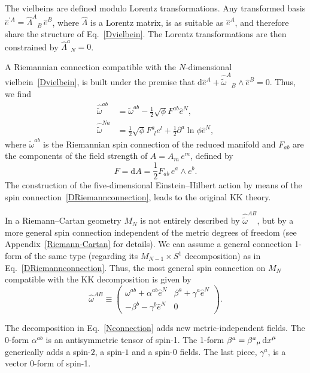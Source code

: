 \documentclass[aps,prd,12pt,superscriptaddress,showpacs,showkeys,longbibliography,reprint,nofootinbib]{revtex4-1}
\begin{document}
The vielbeins are defined modulo Lorentz transformations. Any transformed basis $\hat{e}^{\prime A} = \hat{\Lambda}^A{}_{B}\,\hat{e}^B$,
where $\hat{\Lambda}$ is a Lorentz matrix, is as suitable as $\hat{e}^A$, and therefore share the structure of Eq.~\eqref{Dvielbein}. The Lorentz transformations are then constrained by $\hat{\Lambda}^a{}_{N}=0$.

A Riemannian connection compatible with the \mbox{$N$-dimensional} vielbein~\eqref{Dvielbein}, is built under the premise that $\mbox{d}\hat{e}^A + \hat{\tilde{\omega}}^{A}{}_B \wedge \hat{e}^B = 0$. Thus, we find
\begin{equation}
  \label{DRiemannconnection}
  \begin{split}
    \hat{\tilde{\omega}}^{ab}&=\tilde{\omega}^{ab}-\frac{1}{2}\sqrt{\phi}F^{ab}\hat{e}^N,\\
    \hat{\tilde{\omega}}^{Na}&=\frac{1}{2}\sqrt{\phi}F^a_{\ \ l}e^l+\frac{1}{2}\partial^a\ln\phi\hat{e}^N,
  \end{split}
\end{equation}
where $\tilde{\omega}^{ab}$ is the Riemannian spin connection of the reduced manifold and $F_{ab}$ are the components of the field strength of $A = A_m\, e^m$, defined by
\begin{equation}
  F=\text{d}A=\frac{1}{2}F_{ab}\, e^a\wedge e^b.
\end{equation}
The construction of the five-dimensional Einstein--Hilbert action by means of the spin connection~\eqref{DRiemannconnection}, leads to the original KK theory.

In a Riemann--Cartan geometry $M_N$ is not entirely described by $\hat{\tilde{\omega}}^{AB}$, but by a more general spin connection independent of the metric degrees of freedom (see Appendix~\ref{Riemann-Cartan} for details). We can assume a general connection 1-form of the same type (regarding its $M_{N-1}\times S^1$ decomposition) as in Eq.~\eqref{DRiemannconnection}. Thus, the most general spin connection on $M_N$ compatible with the KK decomposition is given by 
\begin{equation}\label{Nconnection}
  \hat{\omega}^{AB} \equiv
  \begin{pmatrix}
    \omega^{ab}+\alpha^{ab}\hat{e}^N & \beta^a+\gamma^a\hat{e}^N\\
    -\beta^b-\gamma^b\hat{e}^N & 0
  \end{pmatrix}.
\end{equation}

The decomposition in Eq.~\eqref{Nconnection} adds new metric-independent fields. The 0-form $\alpha^{ab}$ is an antisymmetric tensor of spin-1. The 1-form $\beta^a = \beta^a{}_\mu \mathop{\mathrm{d}x}\nolimits^\mu$ generically adds a spin-$2$, a spin-$1$ and a spin-$0$ fields. The last piece, $\gamma^a$, is a vector $0$-form of spin-1.
\end{document}
